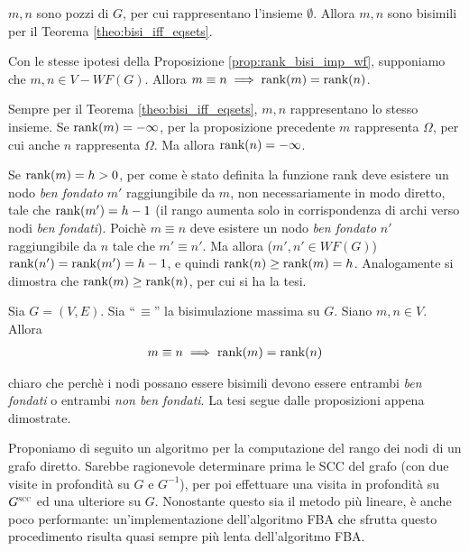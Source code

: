 \begin{proof2}
    $m,n$ sono pozzi di $G$, per cui rappresentano l'insieme $\emptyset$. Allora $m,n$ sono bisimili per il Teorema \ref{theo:bisi_iff_eqsets}.
\end{proof2}
\begin{proposition}
    Con le stesse ipotesi della Proposizione \ref{prop:rank_bisi_imp_wf}, supponiamo che $m,n \in V - WF(G)$. Allora $m \equiv n \implies \textup{rank}(m) = \textup{rank}(n)$.
\end{proposition}
\begin{proof2}
    Sempre per il Teorema \ref{theo:bisi_iff_eqsets}, $m,n$ rappresentano lo stesso insieme. Se $\textup{rank}(m) = -\infty$, per la proposizione precedente $m$ rappresenta $\Omega$, per cui anche $n$ rappresenta $\Omega$. Ma allora $\textup{rank}(n) = -\infty$.

    Se $\textup{rank}(m) = h > 0$, per come è stato definita la funzione rank deve esistere un nodo \emph{ben fondato} $m'$ raggiungibile da $m$, non necessariamente in modo diretto, tale che $\textup{rank}(m') = h-1$ (il rango aumenta solo in corrispondenza di archi verso nodi \emph{ben fondati}). Poichè $m \equiv n$ deve esistere un nodo \emph{ben fondato} $n'$ raggiungibile da $n$ tale che $m' \equiv n'$. Ma allora ($m',n' \in WF(G)$) $\textup{rank}(n') = \textup{rank}(m') = h-1$, e quindi $\textup{rank}(n) \geq \textup{rank}(m) = h$. Analogamente si dimostra che $\textup{rank}(m) \geq \textup{rank}(n)$, per cui si ha la tesi.
\end{proof2}
\begin{theorem}
    \label{theo:bisi_rank}
    Sia $G = (V,E)$. Sia ``\,$\equiv$'' la bisimulazione massima su $G$. Siano $m,n \in V$. Allora
    \begin{gather*}
        m \equiv n \implies \textup{rank}(m) = \textup{rank}(n)
    \end{gather*}
\end{theorem}
\begin{proof2}
    \accente chiaro che perchè i nodi possano essere bisimili devono essere entrambi \emph{ben fondati} o entrambi \emph{non ben fondati}. La tesi segue dalle proposizioni appena dimostrate.
\end{proof2}

Proponiamo di seguito un algoritmo per la computazione del rango dei nodi di un grafo diretto. Sarebbe ragionevole determinare prima le SCC del grafo (con due visite in profondità su $G$ e $G^{-1}$), per poi effettuare una visita in profondità su $G^{\superscc}$ ed una ulteriore su $G$. Nonostante questo sia il metodo più lineare, è anche poco performante: un'implementazione dell'algoritmo FBA che sfrutta questo procedimento risulta quasi sempre più lenta dell'algoritmo FBA.

